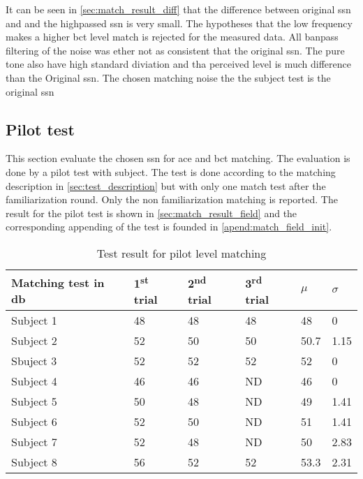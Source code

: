 It can be seen in \autoref{sec:match_result_diff} that the difference between original \gls{ssn} and and the highpassed \gls{ssn} is very small. The hypotheses that the low frequency makes a higher \gls{bct} level match is rejected for the measured data. All banpass filtering of the noise was ether not as consistent that the original \gls{ssn}. The pure tone also have high standard diviation and tha perceived level is much difference than the Original \gls{ssn}. The chosen matching noise the the subject test is the original \gls{ssn}



\subsection{Pilot test}
\label{sec:pilot_test}
This section evaluate the chosen \gls{ssn} for \gls{ace} and \gls{bct} matching. The evaluation is done by a pilot test with subject. The test is done according to the matching description in \autoref{sec:test_description} but with only one match test after the familiarization round. Only the non familiarization matching is reported. The result for the pilot test is shown in \autoref{sec:match_result_field} and the corresponding appending of the test is founded in \autoref{apend:match_field_init}.

\begin{table}[H]
\centering
\caption{Test result for pilot level matching}
\begin{tabular}{l|lll|ll}
Matching test in \si{\decibel}   & 1\textsuperscript{st} trial & 2\textsuperscript{nd} trial & 3\textsuperscript{rd} trial & $\mu$ & $\sigma$ \\ \hline
Subject 1  & 48          & 48           & 48          & 48          & 0                  \\
Subject 2  & 52          & 50           & 50          & 50.7        & 1.15               \\
Sbuject 3  & 52          & 52           & 52          & 52          & 0                  \\
Subject 4  & 46          & 46           & ND          & 46          & 0                  \\
Subject 5  & 50          & 48           & ND          & 49          & 1.41               \\
Subject 6  & 52          & 50           & ND          & 51          & 1.41               \\
Subject 7  & 52          & 48           & ND          & 50          & 2.83               \\
Subject 8  & 56          & 52           & 52          & 53.3        & 2.31             
\end{tabular}
\label{sec:match_result_field}
\end{table}

